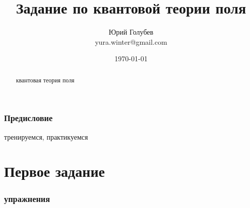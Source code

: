 \documentclass[a4paper,12pt]{article} %
\author{Юрий Голубев\\ yura.winter@gmail.com }
\title{Задание по квантовой теории поля}
\date{\today}
\begin{document}
\maketitle

\begin{abstract}
квантовая теория поля
\end{abstract}
\tableofcontents


\section*{Предисловие}

тренируемся, практикуемся


















\clearpage
\part{Первое задание}


\section{упражнения}
\end{document}
